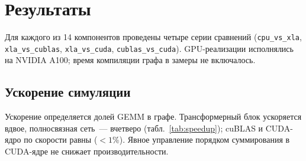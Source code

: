 \section{Результаты}
\label{sec:results}

Для каждого из 14 компонентов проведены четыре серии сравнений
(\texttt{cpu\_vs\_xla}, \texttt{xla\_vs\_cublas}, \texttt{xla\_vs\_cuda},
\texttt{cublas\_vs\_cuda}). GPU-реализации исполнялись на NVIDIA A100; время
компиляции графа в замеры не включалось.

\subsection{Ускорение симуляции}

Ускорение определяется долей GEMM в графе. Трансформерный блок ускоряется вдвое,
полносвязная сеть~--- вчетверо (табл.~\ref{tab:speedup}); cuBLAS и CUDA-ядро по
скорости равны ($<1\%$). Явное управление порядком суммирования в CUDA-ядре не
снижает производительности.

\begin{table}[htbp]
    \centering
    \caption{Ускорение симуляции при переносе GEMM на GPU.}
    \label{tab:speedup}
\end{table}

